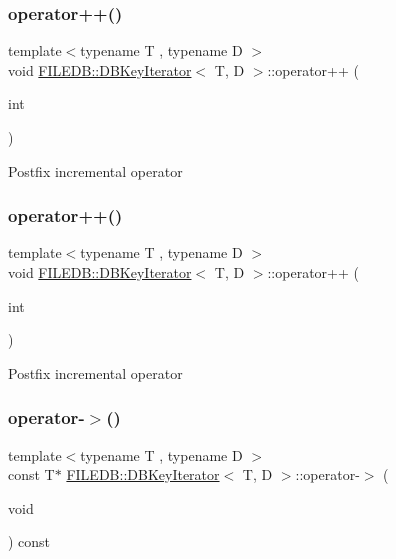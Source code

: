 \subsubsection{\texorpdfstring{operator++()}{operator++()}\hspace{0.1cm}{\footnotesize\ttfamily [5/6]}}
{\footnotesize\ttfamily template$<$typename T , typename D $>$ \\
void \mbox{\hyperlink{classFILEDB_1_1DBKeyIterator}{F\+I\+L\+E\+D\+B\+::\+D\+B\+Key\+Iterator}}$<$ T, D $>$\+::operator++ (\begin{DoxyParamCaption}\item[{int}]{ }\end{DoxyParamCaption})\hspace{0.3cm}{\ttfamily [inline]}}

Postfix incremental operator \mbox{\label{classFILEDB_1_1DBKeyIterator_a364ac0414da6888e0b981f07b3239257}} 
\subsubsection{\texorpdfstring{operator++()}{operator++()}\hspace{0.1cm}{\footnotesize\ttfamily [6/6]}}
{\footnotesize\ttfamily template$<$typename T , typename D $>$ \\
void \mbox{\hyperlink{classFILEDB_1_1DBKeyIterator}{F\+I\+L\+E\+D\+B\+::\+D\+B\+Key\+Iterator}}$<$ T, D $>$\+::operator++ (\begin{DoxyParamCaption}\item[{int}]{ }\end{DoxyParamCaption})\hspace{0.3cm}{\ttfamily [inline]}}

Postfix incremental operator \mbox{\label{classFILEDB_1_1DBKeyIterator_a453e5281ba078f217558d44c049c564c}} 
\subsubsection{\texorpdfstring{operator-\/$>$()}{operator->()}\hspace{0.1cm}{\footnotesize\ttfamily [1/3]}}
{\footnotesize\ttfamily template$<$typename T , typename D $>$ \\
const T$\ast$ \mbox{\hyperlink{classFILEDB_1_1DBKeyIterator}{F\+I\+L\+E\+D\+B\+::\+D\+B\+Key\+Iterator}}$<$ T, D $>$\+::operator-\/$>$ (\begin{DoxyParamCaption}\item[{void}]{ }\end{DoxyParamCaption}) const\hspace{0.3cm}{\ttfamily [inline]}}

